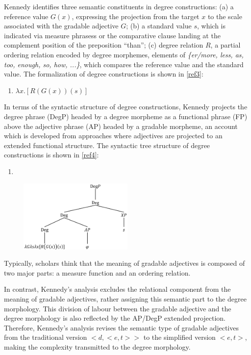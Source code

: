 \documentclass{ctexart}
\let \cite \parencite
\begin{document}
Kennedy identifies three semantic constituents in degree constructions\cite{russell1905}: (a) a reference value $G(x)$, expressing the projection from the target $x$ to the scale associated with the gradable adjective $G$; (b) a standard value $s$, which is indicated via measure phrasess or the comparative clause landing at the complement position of the preposition “than”; (c) degree relation $R$, a partial ordering relation encoded by degree morphemes, elements of \textit{\{er/more, less, as, too, enough, so, how, ...\}}, which compares the reference value and the standard value. The formalization of degree constructions is shown in \ref{ref3}:

\begin{enumerate}[resume]
\item \label{ref3} $\lambda x.[R(G(x))(s)]$
\end{enumerate}

In terms of the syntactic structure of degree constructions, Kennedy projects the degree phrase (DegP) headed by a degree morpheme as a functional phrase (FP) above the adjective phrase (AP) headed by a gradable morpheme, an account which is developed from approaches where adjectives are projected to an extended functional structure\cite{abney1987,corver1990,corver1997b,grimshaw1991}. The syntactic tree structure of degree constructions is shown in \ref{ref4}:

\begin{enumerate}[resume]
\item \label{ref4}
\end{enumerate}

\begin{figure}[h]
\centering
\includegraphics[width=0.5\textwidth]{pic/pic1.png}
\end{figure}

Typically, scholars think that the meaning of gradable adjectives is composed of two major parts: a measure function and an ordering relation\cite{carston2013,horn1992}.

In contrast, Kennedy’s analysis excludes the relational component from the meaning of gradable adjectives, rather assigning this semantic part to the degree morphology. This division of labour between the gradable adjective and the degree morphology is also reflected by the AP/DegP extended projection. Therefore, Kennedy’s analysis revises the semantic type of gradable adjectives from the traditional version $<d,<e,t>>$ to the simplified version $<e,t>$, making the complexity transmitted to the degree morphology.
\end{document}
